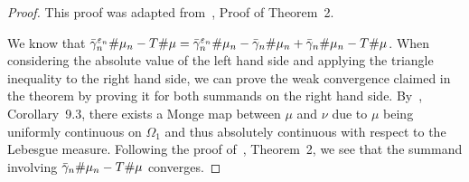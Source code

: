 \begin{proof}
	This proof was adapted from~\cite{Seg2018}, Proof of Theorem~2.

	We know that $\push[\bar{\gamma}_n^{\varepsilon_n}]{\mu_n} - \push{\mu} = \push[\bar{\gamma}_n^{\varepsilon_n}]{\mu_n} - \push[\bar{\gamma}_n]{\mu_n} + \push[\bar{\gamma}_n]{\mu_n} - \push{\mu}$. When considering the absolute value of the left hand side and applying the triangle inequality to the right hand side, we can prove the weak convergence claimed in the theorem by proving it for both summands on the right hand side.	By~\cite{Vill2009}, Corollary~9.3, there exists a Monge map between $\mu$ and $\nu$ due to $\mu$ being uniformly continuous on $\Omega_1$ and thus absolutely continuous with respect to the Lebesgue measure. Following the proof of~\cite{Seg2018}, Theorem~2, we see that the summand involving $\push[\bar{\gamma}_n]{\mu_n} - \push[T]{\mu}$ converges.
	

\end{proof}
